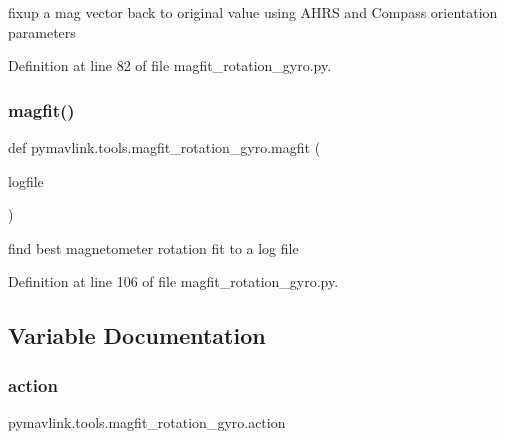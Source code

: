 \begin{DoxyVerb}fixup a mag vector back to original value using AHRS and Compass orientation parameters\end{DoxyVerb}
 

Definition at line 82 of file magfit\+\_\+rotation\+\_\+gyro.\+py.

\mbox{\label{namespacepymavlink_1_1tools_1_1magfit__rotation__gyro_ae8efb99d4a985344c87bdda430c85b7c}} 
\subsubsection{\texorpdfstring{magfit()}{magfit()}}
{\footnotesize\ttfamily def pymavlink.\+tools.\+magfit\+\_\+rotation\+\_\+gyro.\+magfit (\begin{DoxyParamCaption}\item[{}]{logfile }\end{DoxyParamCaption})}

\begin{DoxyVerb}find best magnetometer rotation fit to a log file\end{DoxyVerb}
 

Definition at line 106 of file magfit\+\_\+rotation\+\_\+gyro.\+py.



\subsection{Variable Documentation}
\mbox{\label{namespacepymavlink_1_1tools_1_1magfit__rotation__gyro_a4cdc3788f5093934f2722388d1463508}} 
\subsubsection{\texorpdfstring{action}{action}}
{\footnotesize\ttfamily pymavlink.\+tools.\+magfit\+\_\+rotation\+\_\+gyro.\+action}



